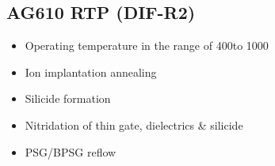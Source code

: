 \subsection{AG610 RTP (DIF-R2)}\label{thermal_RTAAG610_machine}

	\begin{itemize}
		\item Operating temperature in the range of 400\degreesC to 1000\degreesC
		\item Ion implantation annealing
		\item Silicide formation
		\item Nitridation of thin gate, dielectrics \& silicide
		\item PSG/BPSG reflow
	\end{itemize}
